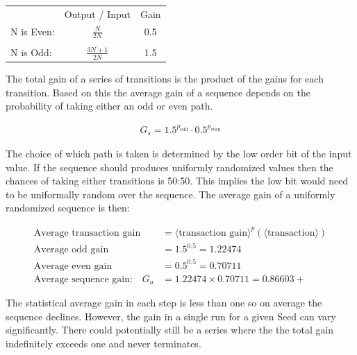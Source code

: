 \documentclass[letterpaper]{article}
\begin{document}
\begin{multicols}{2}
\begin{center}
\begin{tabular}{l c c}
  & Output / Input & Gain \\
 N is Even: &  $\frac{N}{2N}$  & 0.5 \\  
&&\\
 N is Odd: & $\frac{3N + 1}{2N}$ & 1.5
\end{tabular}
\end{center}

The total gain of a series of transitions is the product of the gains for each transition. Based on this the average gain of a sequence depends on the probability of taking either an odd or even path.

\begin{align*}
    G_s = 1.5^{p_{\text{odd}}} \cdot 0.5^{p_{\text{even}}}
\end{align*}

The choice of which path is taken is determined by the low order bit of the input value. If the sequence should produces uniformly randomized values then the chances of taking either transitions is 50:50. This implies the low bit would need to be uniformally random over the sequence. The average gain of a uniformly randomized sequence is then:

\begin{align*}
    \text{Average transaction gain} &= \langle \text{transaction gain} \rangle^p(\langle \text{transaction} \rangle) \\
    \text{Average odd gain} &= 1.5^{0.5} = 1.22474 \\
    \text{Average even gain} &= 0.5^{0.5} = 0.70711 \\
    \text{Average sequence gain:} \quad G_a &= 1.22474 \times 0.70711 = 0.86603+
\end{align*}

The statistical average gain in each step is less than one so on average the sequence declines. However, the gain in a single run for a given Seed can vary significantly. There could potentially still be a series where the the total gain indefinitely exceeds one and never terminates.


\end{multicols}
\end{document}
